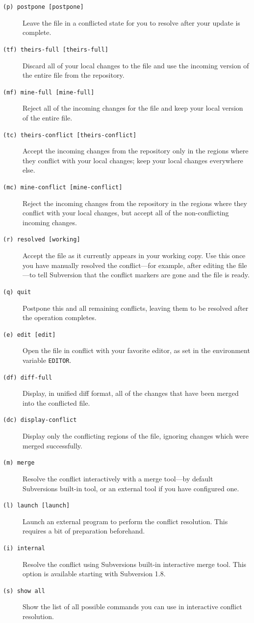 \begin{description}
\item[\texttt{(p)\ postpone\ {[}postpone{]}}]
Leave the file in a conflicted state for you to resolve after your update
is complete.
\item[\texttt{(tf)\ theirs-full\ {[}theirs-full{]}}]
Discard all of your local changes to the file and use the incoming
version of the entire file from the repository.
\item[\texttt{(mf)\ mine-full\ {[}mine-full{]}}]
Reject all of the incoming changes for the file and keep your local
version of the entire file.
\item[\texttt{(tc)\ theirs-conflict\ {[}theirs-conflict{]}}]
Accept the incoming changes from the repository only in the regions where
they conflict with your local changes; keep your local changes
everywhere else.
\item[\texttt{(mc)\ mine-conflict\ {[}mine-conflict{]}}]
Reject the incoming changes from the repository in the regions where they
conflict with your local changes, but accept all of the non-conflicting
incoming changes.
\item[\texttt{(r)\ resolved\ {[}working{]}}]
Accept the file as it currently appears in your working copy. Use this
once you have manually resolved the conflict---for example, after editing
the file---to tell Subversion that the conflict markers are gone and the
file is ready.
\item[\texttt{(q)\ quit}]
Postpone this and all remaining conflicts, leaving them to be resolved
after the operation completes.
\item[\texttt{(e)\ edit\ {[}edit{]}}]
Open the file in conflict with your favorite editor, as set in the
environment variable \texttt{EDITOR}.
\item[\texttt{(df)\ diff-full}]
Display, in unified diff format, all of the changes that have been merged
into the conflicted file.
\item[\texttt{(dc)\ display-conflict}]
Display only the conflicting regions of the file, ignoring changes which
were merged successfully.
\item[\texttt{(m)\ merge}]
Resolve the conflict interactively with a merge tool---by default
Subversion\textquotesingle s built-in tool, or an external tool if you
have configured one.
\item[\texttt{(l)\ launch\ {[}launch{]}}]
Launch an external program to perform the conflict resolution. This
requires a bit of preparation beforehand.
\item[\texttt{(i)\ internal}]
Resolve the conflict using Subversion\textquotesingle s built-in
interactive merge tool. This option is available starting with Subversion
1.8.
\item[\texttt{(s)\ show\ all}]
Show the list of all possible commands you can use in interactive
conflict resolution.
\end{description}

